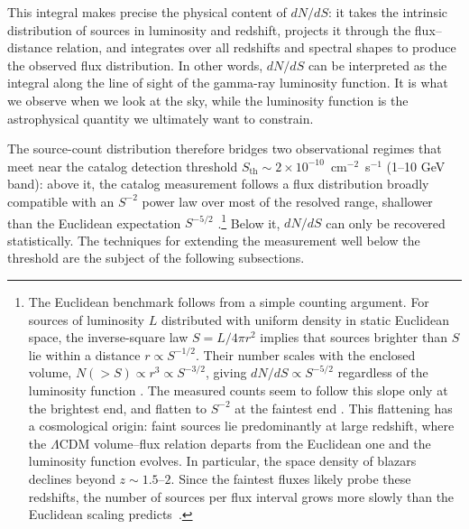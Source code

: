 This integral makes precise the physical content of $dN/dS$: it takes the intrinsic distribution of sources in luminosity and redshift, projects it through the flux--distance relation, and integrates over all redshifts and spectral shapes to produce the observed flux distribution.
In other words, $dN/dS$ can be interpreted as the integral along the line of sight of the gamma-ray luminosity function. It is what we observe when we look at the sky, while the luminosity function is the astrophysical quantity we ultimately want to constrain.

The source-count distribution therefore bridges two observational regimes that meet near the catalog detection threshold $S_\mathrm{th} \sim 2 \times 10^{-10}$~cm$^{-2}$~s$^{-1}$ (1--10 GeV band): above it, the catalog measurement follows a flux distribution broadly compatible with an $S^{-2}$ power law over most of the resolved range, shallower than the Euclidean expectation $S^{-5/2}$ \cite{malyshev2011statistics,Fermi-LAT:2010tsy}.\footnote{The Euclidean benchmark follows from a simple counting argument. For sources of luminosity $L$ distributed with uniform density in static Euclidean space, the inverse-square law $S = L/4\pi r^2$ implies that sources brighter than $S$ lie within a distance $r \propto S^{-1/2}$. Their number scales with the enclosed volume, $N({>}S) \propto r^3 \propto S^{-3/2}$, giving $dN/dS \propto S^{-5/2}$ regardless of the luminosity function \cite{malyshev2011statistics}. The measured counts seem to follow this slope only at the brightest end, and flatten to $S^{-2}$ at the faintest end \cite{Fermi-LAT:2010tsy,Cuoco-1pdf}. This flattening has a cosmological origin: faint sources lie predominantly at large redshift, where the $\Lambda$CDM volume--flux relation departs from the Euclidean one and the luminosity function evolves. In particular, the space density of blazars declines beyond $z \sim 1.5$--$2$. Since the faintest fluxes likely probe these redshifts, the number of sources per flux interval grows more slowly than the Euclidean scaling predicts~\cite{Fermi-LAT:2010tsy,Lisanti:2016jub}.} Below it, $dN/dS$ can only be recovered statistically. The techniques for extending the measurement well below the threshold are the subject of the following subsections.

